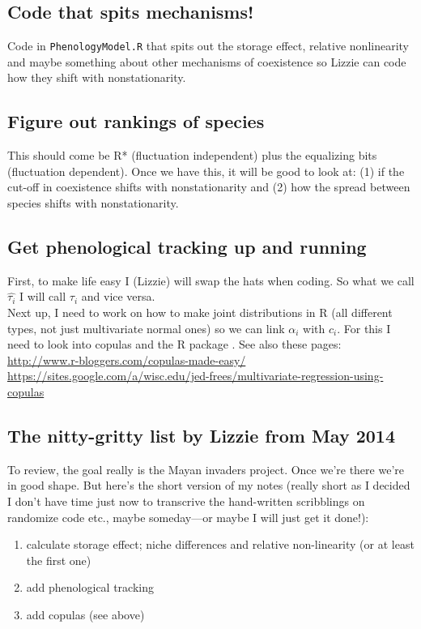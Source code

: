 \documentclass[11pt,a4paper,oneside]{article}
\begin{document}
\subsection{Code that spits mechanisms!}
Code in \verb|PhenologyModel.R| that spits out the storage effect, relative nonlinearity and maybe something about other mechanisms of coexistence so Lizzie can code how they shift with nonstationarity.

\subsection{Figure out rankings of species}
This should come be R* (fluctuation independent) plus the equalizing bits (fluctuation dependent). Once we have this, it will be good to look at: (1) if the cut-off in coexistence shifts with nonstationarity and (2) how the spread between species shifts with nonstationarity.

\subsection{Get phenological tracking up and running}
First, to make life easy I (Lizzie) will swap the hats when coding. So what we call \(\hat{\tau_{i}}\) I will call \(\tau_{i}\) and vice versa.\\

\noindent Next up, I need to work on how to make joint distributions in R (all different types, not just multivariate normal ones) so we can link \(\alpha_{i}\) with \(c_{i}\). For this I need to look into copulas and the R package \verb@copula@. See also these pages:\\
\url{http://www.r-bloggers.com/copulas-made-easy/}\\
\url{https://sites.google.com/a/wisc.edu/jed-frees/multivariate-regression-using-copulas}

\subsection{The nitty-gritty list by Lizzie from May 2014}
To review, the goal really is the Mayan invaders project. Once we're there we're in good shape. But here's the short version of my notes (really short as I decided I don't have time just now to transcrive the hand-written scribblings on randomize code etc., maybe someday---or maybe I will just get it done!):
\begin{enumerate}
\item calculate storage effect; niche differences and relative non-linearity (or at least the first one)
\item add phenological tracking
\item add copulas (see above)
\end{enumerate}
\end{document}
